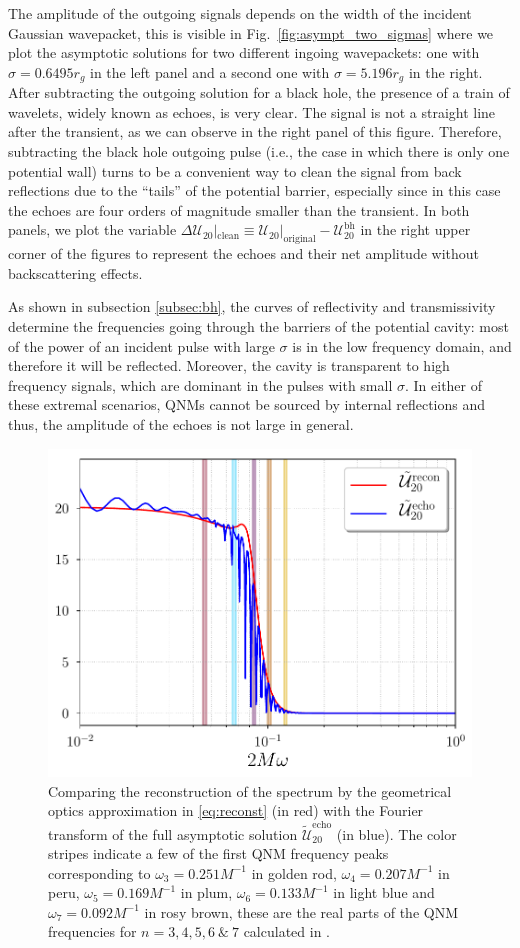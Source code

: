 \documentclass[article,aps,nofootinbib,twocolumn,superscriptaddress]{revtex4-1}
\begin{document}
The amplitude of the outgoing signals depends on the width of the incident Gaussian wavepacket, this is visible in Fig.~\ref{fig:asympt_two_sigmas} where we plot the asymptotic solutions for two different ingoing wavepackets: one with $\sigma=0.6495r_g$ in the left panel and a second one with $\sigma=5.196r_g$ in the right. After subtracting the outgoing solution for a black hole, the presence of a train of wavelets, widely known as echoes, is very clear. The signal is not a straight line after the transient, as we can observe in the right panel of this figure. Therefore, subtracting the black hole outgoing pulse (i.e., the case in which there is only one potential wall) turns to be a convenient way to clean the signal from back reflections due to the ``tails'' of the potential barrier, especially since in this case the echoes are four orders of magnitude smaller than the transient. In both panels, we plot the variable $\Delta\mathcal{U}_{20}|_{\mathrm{clean}}\equiv\mathcal{U}_{20}|_{\mathrm{original}}-\mathcal{U}^{\mathrm{bh}}_{20}$ in the right upper corner of the figures to represent the echoes and their net amplitude without backscattering effects.
 
As shown in subsection \ref{subsec:bh}, the curves of reflectivity and transmissivity determine the frequencies going through the barriers of the potential cavity: most of the power of an incident pulse with large $\sigma$ is in the low frequency domain, and therefore it will be reflected. Moreover, the cavity is transparent to high frequency signals, which are dominant in the pulses with small $\sigma$. In either of these extremal scenarios, QNMs cannot be sourced by internal reflections and thus, the amplitude of the echoes is not large in general.\\
 
\begin{figure}[t!]
\centering
\includegraphics[width=.45\textwidth]{figures/Reconst_omega_scalar.pdf}
\caption{\label{fig:rec_scalar} Comparing the reconstruction of the spectrum by the geometrical optics approximation in \eqref{eq:reconst} (in red) with the Fourier transform of the full asymptotic solution $\tilde{\mathcal{U}}_{20}^{\mathrm{echo}}$ (in blue). The color stripes indicate a few of the first QNM frequency peaks corresponding to $\omega_3=0.251M^{-1}$ in golden rod, $\omega_4=0.207M^{-1}$ in peru, $\omega_5=0.169M^{-1}$ in plum, $\omega_6=0.133M^{-1}$ in light blue and $\omega_7=0.092M^{-1}$ in rosy brown, these are the real parts of the QNM frequencies for $n=3,4,5,6~\&~7$ calculated in \citep{PhysRevD.46.4179}.}
\end{figure} 
\end{document}
